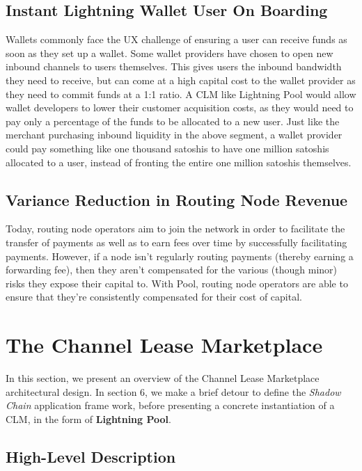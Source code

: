 \documentclass[10pt,a4paper]{article}
\theoremstyle{definition}
\begin{document}
\subsection{Instant Lightning Wallet User On Boarding}

Wallets commonly face the UX challenge of ensuring a user can receive funds as
soon as they set up a wallet. Some wallet providers have chosen to open new
inbound channels to users themselves. This gives users the inbound bandwidth
they need to receive, but can come at a high capital cost to the wallet
provider as they need to commit funds at a 1:1 ratio. A CLM like Lightning Pool would 
allow wallet developers to
lower their customer acquisition costs, as they would need to pay only a percentage of
the funds to be allocated to a new user. Just like the merchant purchasing
inbound liquidity in the above segment, a wallet provider could pay something like 
one thousand satoshis to have one million
satoshis allocated to a user, instead of fronting the entire one million satoshis
themselves.

\subsection{Variance Reduction in Routing Node Revenue}

Today, routing node operators aim to join the network in order to facilitate the
transfer of payments as well as to earn fees over time by successfully facilitating
payments. However, if a node isn't regularly routing payments (thereby earning
a forwarding fee), then they aren't compensated for the various (though minor)
risks they expose their capital to. With Pool, routing node operators are able
to ensure that they're consistently compensated for their cost of capital. 

\section{The Channel Lease Marketplace} %

In this section, we present an overview of the Channel Lease Marketplace
architectural design. In section 6, we make a brief detour to define the
\emph{Shadow Chain} application frame work, before presenting a concrete
instantiation of a CLM, in the form of \textbf{Lightning Pool}. 

\subsection{High-Level Description}
\end{document}
